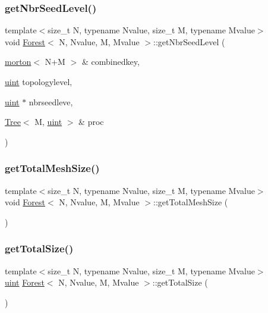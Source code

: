 \subsubsection{\texorpdfstring{get\+Nbr\+Seed\+Level()}{getNbrSeedLevel()}}
{\footnotesize\ttfamily template$<$size\+\_\+t N, typename Nvalue, size\+\_\+t M, typename Mvalue$>$ \\
void \mbox{\hyperlink{classForest}{Forest}}$<$ N, Nvalue, M, Mvalue $>$\+::get\+Nbr\+Seed\+Level (\begin{DoxyParamCaption}\item[{\mbox{\hyperlink{definitions_8h_af8682350bd8bb38ee9023f7a0a310add}{morton}}$<$ N+M $>$ \&}]{combinedkey,  }\item[{\mbox{\hyperlink{definitions_8h_a69aa29b598b851b0640aa225a9e5d61d}{uint}}}]{topologylevel,  }\item[{\mbox{\hyperlink{definitions_8h_a69aa29b598b851b0640aa225a9e5d61d}{uint}} $\ast$}]{nbrseedleve,  }\item[{\mbox{\hyperlink{classTree}{Tree}}$<$ M, \mbox{\hyperlink{definitions_8h_a69aa29b598b851b0640aa225a9e5d61d}{uint}} $>$ \&}]{proc }\end{DoxyParamCaption})}

\mbox{\label{classForest_a08ab89f83fa5282e39221d69b1cb5fbe}} 
\subsubsection{\texorpdfstring{get\+Total\+Mesh\+Size()}{getTotalMeshSize()}}
{\footnotesize\ttfamily template$<$size\+\_\+t N, typename Nvalue, size\+\_\+t M, typename Mvalue$>$ \\
void \mbox{\hyperlink{classForest}{Forest}}$<$ N, Nvalue, M, Mvalue $>$\+::get\+Total\+Mesh\+Size (\begin{DoxyParamCaption}{ }\end{DoxyParamCaption})}

\mbox{\label{classForest_ad6c909506408054f02709b88642dc30c}} 
\subsubsection{\texorpdfstring{get\+Total\+Size()}{getTotalSize()}}
{\footnotesize\ttfamily template$<$size\+\_\+t N, typename Nvalue, size\+\_\+t M, typename Mvalue$>$ \\
\mbox{\hyperlink{definitions_8h_a69aa29b598b851b0640aa225a9e5d61d}{uint}} \mbox{\hyperlink{classForest}{Forest}}$<$ N, Nvalue, M, Mvalue $>$\+::get\+Total\+Size (\begin{DoxyParamCaption}{ }\end{DoxyParamCaption})}

